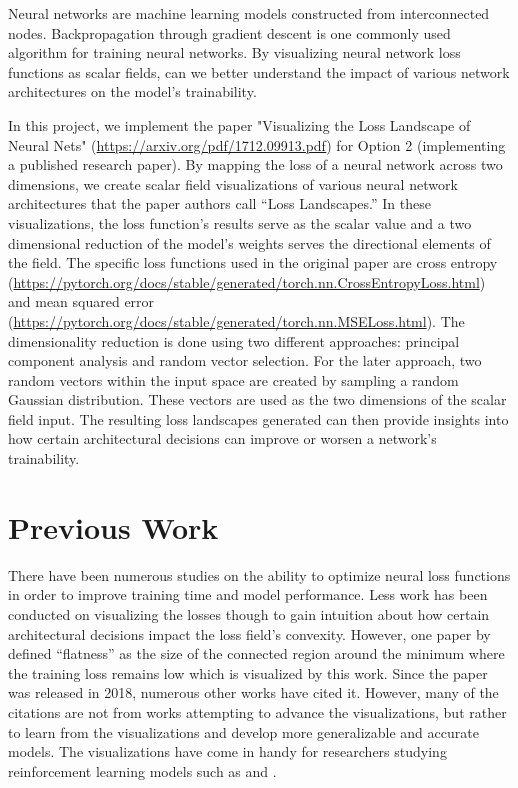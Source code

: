 \documentclass{acmsiggraph}
\begin{document}
Neural networks are machine learning models constructed from interconnected nodes. 
Backpropagation through gradient descent is one commonly used algorithm for training neural networks.
By visualizing neural network loss functions as scalar fields, can we better understand the impact of various network architectures on the model’s trainability.


In this project, we implement the paper "Visualizing the Loss Landscape of Neural Nets" (\url{https://arxiv.org/pdf/1712.09913.pdf}) for Option 2 (implementing a published research paper). 
By mapping the loss of a neural network across two dimensions, we create scalar field visualizations of various neural network architectures that the paper authors call “Loss Landscapes.” 
In these visualizations, the loss function’s results serve as the scalar value and a two dimensional reduction of the model’s weights serves the directional elements of the field. 
The specific loss functions used in the original paper are cross entropy (\url{https://pytorch.org/docs/stable/generated/torch.nn.CrossEntropyLoss.html}) and mean squared error (\url{https://pytorch.org/docs/stable/generated/torch.nn.MSELoss.html}).
The dimensionality reduction is done using two different approaches: principal component analysis and random vector selection. 
For the later approach, two random vectors within the input space are created by sampling a random Gaussian distribution. 
These vectors are used as the two dimensions of the scalar field input. 
The resulting loss landscapes generated can then provide insights into how certain architectural decisions can improve or worsen a network's trainability.


\section{Previous Work}
\label{sec:previous_work}

There have been numerous studies on the ability to optimize neural loss functions in order to improve training time and model performance. 
Less work has been conducted on visualizing the losses though to gain intuition about how certain architectural decisions impact the loss field's convexity. 
However, one paper by ~\cite{hochreiter1997flat} defined “flatness” as the size of the connected region around the minimum where the training loss remains low which is visualized by this work. Since the paper was released in 2018, numerous other works have cited it. However, many of the citations are not from works attempting to advance the visualizations, but rather to learn from the visualizations and develop more generalizable and accurate models. The visualizations have come in handy for researchers studying reinforcement learning models such as \cite{actor2020} and \cite{plaat2022deep}.
\end{document}
